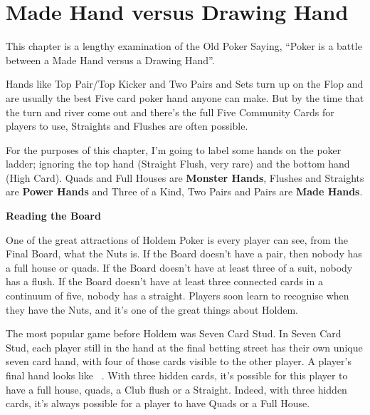 \chapter{Made Hand versus Drawing Hand}

This chapter is a lengthy examination of the Old Poker Saying, ``Poker
is a battle between a Made Hand versus a Drawing Hand''.

Hands like Top Pair/Top Kicker and Two Pairs and Sets turn up on the
Flop and are usually the best Five card poker hand anyone can
make. But by the time that the turn and river come out and there's the
full Five Community Cards for players to use, Straights and Flushes
are often possible.

For the purposes of this chapter, I'm going to label some hands on the
poker ladder; ignoring the top hand (Straight Flush, very rare) and
the bottom hand (High Card). Quads and Full Houses are \textbf{Monster
Hands}, Flushes and Straights are \textbf{Power Hands} and Three of a
Kind, Two Pairs and Pairs are \textbf{Made Hands}.


\textbf{Reading the Board}

One of the great attractions of Holdem Poker is every player can see,
from the Final Board, what the Nuts is. If the Board doesn't have a
pair, then nobody has a full house or quads. If the Board doesn't have
at least three of a suit, nobody has a flush. If the Board doesn't
have at least three connected cards in a continuum of five, nobody has
a straight. Players soon learn to recognise when they have the Nuts,
and it's one of the great things about Holdem.

The most popular game before Holdem was Seven Card Stud. In Seven Card
Stud, each player still in the hand at the final betting street has their
own unique seven card hand, with four of those cards visible to the
other player. A player's final hand looks like
\back\back\nines\Qc\Jc\tred\back\ . With three hidden cards, it's possible
for this player to have a full house, quads, a Club flush or a Straight.
Indeed, with three hidden cards, it's always possible for a player to have
Quads or a Full House.

